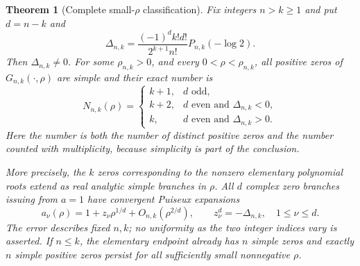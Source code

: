 \documentclass[11pt,a4paper]{article}
\newtheorem{theorem}{Theorem}[section]
\theoremstyle{definition}
\theoremstyle{remark}
\numberwithin{equation}{section}
\begin{document}
\begin{theorem}[Complete small-$\rho$ classification]
\label{lerchboundary:thm:smallrho}
Fix integers $n>k\geq1$ and put $d=n-k$ and
\begin{equation}\label{lerchboundary:eq:Delta}
 \Delta_{n,k}=
 \frac{(-1)^d k!d!}{2^{k+1}n!}P_{n,k}(-\log2).
\end{equation}
Then $\Delta_{n,k}\neq0$.  For some $\rho_{n,k}>0$, and every
$0<\rho<\rho_{n,k}$, all positive zeros of
$G_{n,k}(\cdot,\rho)$ are simple and their exact number is
\begin{equation}\label{lerchboundary:eq:count}
 N_{n,k}(\rho)=
 \begin{cases}
 k+1,&d\text{ odd},\\
 k+2,&d\text{ even and }\Delta_{n,k}<0,\\
 k,&d\text{ even and }\Delta_{n,k}>0.
 \end{cases}
\end{equation}
Here the number is both the number of distinct positive zeros and the
number counted with multiplicity, because simplicity is part of the
conclusion.

More precisely, the $k$ zeros corresponding to the nonzero elementary
polynomial roots extend as real analytic simple branches in $\rho$.
All $d$ complex zero branches issuing from $a=1$ have convergent Puiseux
expansions
\begin{equation}\label{lerchboundary:eq:puiseux}
 a_\nu(\rho)=1+z_\nu\rho^{1/d}+O_{n,k}(\rho^{2/d}),
 \qquad z_\nu^d=-\Delta_{n,k},\quad 1\leq\nu\leq d.
\end{equation}
The error describes fixed $n,k$; no uniformity as the two integer indices
vary is asserted.  If $n\leq k$, the elementary endpoint already has
$n$ simple zeros and exactly $n$ simple positive zeros persist for all
sufficiently small nonnegative $\rho$.
\end{theorem}
\end{document}

